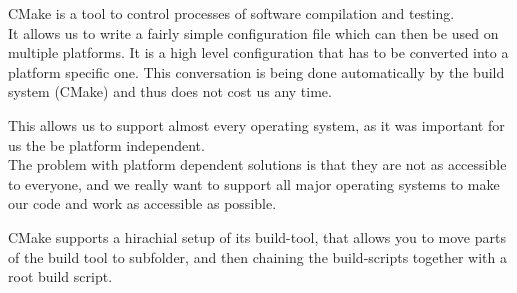 CMake is a tool to control processes of software compilation and testing. \cite{cmake} \\
It allows us to write a fairly simple configuration file which can then be used on multiple platforms.
It is a high level configuration that has to be converted into a platform specific one. This conversation is being done automatically by the build system (CMake) and thus does not cost us any time.

This allows us to support almost every operating system, as it was important for us the be platform independent. \\
The problem with platform dependent solutions is that they are not as accessible to everyone, and we really want to support all major operating systems to make our code and work as accessible as possible.

CMake supports a hirachial setup of its build-tool, that allows you to move parts of the build tool to subfolder, and then chaining the build-scripts together with a root build script.\cite{cmake}